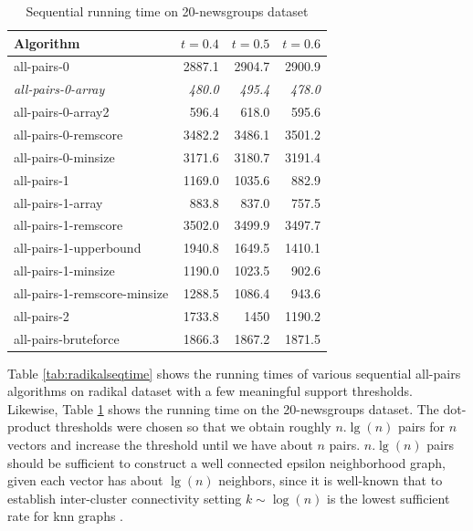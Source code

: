 \documentclass{comjnl}
\begin{document}
\begin{table}
  \centering
  \caption{Sequential running time on 20-newsgroups dataset }
  \begin{tabular}{l r r r}
    Algorithm & $t=0.4$& $t=0.5$& $t=0.6$\\ \hline
    all-pairs-0 &2887.1 &2904.7 &2900.9\\ 
    \emph{all-pairs-0-array} &\emph{480.0} &\emph{495.4} &\emph{478.0}\\ 
    all-pairs-0-array2 & 596.4 & 618.0 & 595.6\\ 
    all-pairs-0-remscore & 3482.2 & 3486.1 & 3501.2\\ 
    all-pairs-0-minsize&3171.6 & 3180.7 & 3191.4\\ 
    all-pairs-1 &1169.0 & 1035.6 & 882.9\\ 
    all-pairs-1-array & 883.8 & 837.0 &757.5\\ 
    all-pairs-1-remscore&3502.0 & 3499.9 & 3497.7\\ 
    all-pairs-1-upperbound&1940.8 &1649.5 & 1410.1\\ 
    all-pairs-1-minsize&1190.0 & 1023.5 & 902.6\\ 
    all-pairs-1-remscore-minsize & 1288.5 & 1086.4 & 943.6\\ 
    all-pairs-2 &1733.8 & 1450 & 1190.2\\ 
    all-pairs-bruteforce & 1866.3 & 1867.2 & 1871.5 \\ \hline
  \end{tabular}
  \label{tab:20-newsgroupsseqtime}
\end{table}

Table \ref{tab:radikalseqtime} shows the running times of various
sequential all-pairs algorithms on radikal dataset with a few
meaningful support thresholds.  Likewise, Table
\ref{tab:20-newsgroupsseqtime} shows the running time on the
20-newsgroups dataset. The dot-product thresholds were chosen so that
we obtain roughly $n.\lg(n)$ pairs for $n$ vectors and increase the
threshold until we have about $n$ pairs. $n.\lg(n)$ pairs should be
sufficient to construct a well connected epsilon neighborhood graph,
given each vector has about $\lg(n)$ neighbors, since it is well-known
that to establish inter-cluster connectivity setting $k \sim \log(n)$
is the lowest sufficient rate for knn graphs \cite{brito1997}.
\end{document}
